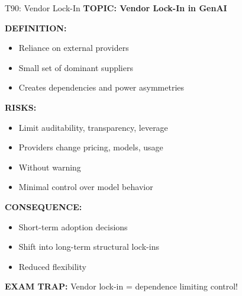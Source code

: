 \documentclass[8pt]{beamer}
\begin{document}
	\begin{frame}{T90: Vendor Lock-In}
		\fontsize{6.5}{7.5}\selectfont
		\textbf{TOPIC: Vendor Lock-In in GenAI}
		
		\vspace{0.1cm}
		\textbf{DEFINITION:}
		\begin{itemize}
			\item Reliance on external providers
			\item Small set of dominant suppliers
			\item Creates dependencies and power asymmetries
		\end{itemize}
		
		\vspace{0.1cm}
		\textbf{RISKS:}
		\begin{itemize}
			\item Limit auditability, transparency, leverage
			\item Providers change pricing, models, usage
			\item Without warning
			\item Minimal control over model behavior
		\end{itemize}
		
		\vspace{0.1cm}
		\textbf{CONSEQUENCE:}
		\begin{itemize}
			\item Short-term adoption decisions
			\item Shift into long-term structural lock-ins
			\item Reduced flexibility
		\end{itemize}
		
		\textcolor{myred}{\textbf{EXAM TRAP:}} Vendor lock-in = \textcolor{myblue}{dependence limiting control}!
	\end{frame}
	
\end{document}
